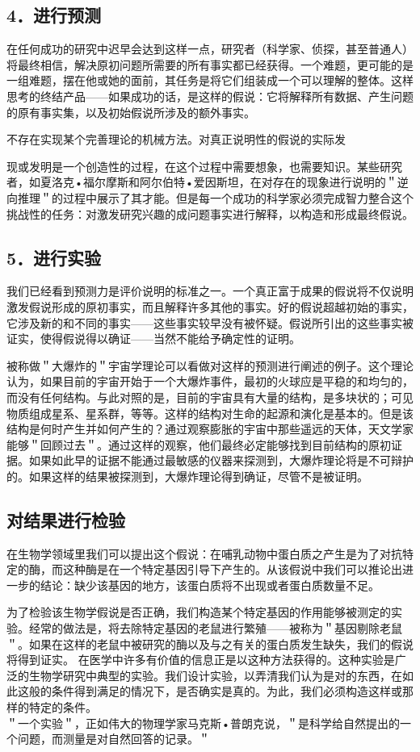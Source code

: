 \subsection{4．进行预测}
在任何成功的研究中迟早会达到这样一点，研究者（科学家、侦探，甚至普通人）将最终相信，解决原初问题所需要的所有事实都已经获得。一个难题，更可能的是一组难题，摆在他或她的面前，其任务是将它们组装成一个可以理解的整体。这样思考的终结产品——如果成功的话，是这样的假说：它将解释所有数据、产生问题的原有事实集，以及初始假说所涉及的额外事实。

不存在实现某个完善理论的机械方法。对真正说明性的假说的实际发

现或发明是一个创造性的过程，在这个过程中需要想象，也需要知识。某些研究者，如夏洛克•福尔摩斯和阿尔伯特•爱因斯坦，在对存在的现象进行说明的＂逆向推理＂的过程中展示了其才能。但是每一个成功的科学家必须完成智力整合这个挑战性的任务：对激发研究兴趣的成问题事实进行解释，以构造和形成最终假说。\cite{peirce1958}

\subsection{5．进行实验}
我们已经看到预测力是评价说明的标准之一。一个真正富于成果的假说将不仅说明激发假说形成的原初事实，而且解释许多其他的事实。好的假说超越初始的事实，它涉及新的和不同的事实——这些事实较早没有被怀疑。假说所引出的这些事实被证实，使得假说得以确证——当然不能给予确定性的证明。

被称做＂大爆炸的＂宇宙学理论可以看做对这样的预测进行阐述的例子。这个理论认为，如果目前的宇宙开始于一个大爆炸事件，最初的火球应是平稳的和均匀的，而没有任何结构。与此对照的是，目前的宇宙具有大量的结构，是多块状的；可见物质组成星系、星系群，等等。这样的结构对生命的起源和演化是基本的。但是该结构是何时产生并如何产生的？通过观察膨胀的宇宙中那些遥远的天体，天文学家能够＂回顾过去＂。通过这样的观察，他们最终必定能够找到目前结构的原初证据。如果如此早的证据不能通过最敏感的仪器来探测到，大爆炸理论将是不可辩护的。如果这样的结果被探测到，大爆炸理论得到确证，尽管不是被证明。

\subsection{对结果进行检验}
在生物学领域里我们可以提出这个假说：在哺乳动物中蛋白质之产生是为了对抗特定的酶，而这种酶是在一个特定基因引导下产生的。从该假说中我们可以推论出进一步的结论：缺少该基因的地方，该蛋白质将不出现或者蛋白质数量不足。

为了检验该生物学假说是否正确，我们构造某个特定基因的作用能够被测定的实验。经常的做法是，将去除特定基因的老鼠进行繁殖——被称为＂基因剔除老鼠＂。如果在这样的老鼠中被研究的酶以及与之有关的蛋白质发生缺失，我们的假说将得到证实。\cite{capecchi1994} 在医学中许多有价值的信息正是以这种方法获得的。这种实验是广泛的生物学研究中典型的实验。我们设计实验，以弄清我们认为是对的东西，在如此这般的条件得到满足的情况下，是否确实是真的。为此，我们必须构造这样或那样的特定的条件。\\
＂一个实验＂，正如伟大的物理学家马克斯•普朗克说，＂是科学给自然提出的一个问题，而测量是对自然回答的记录。＂

